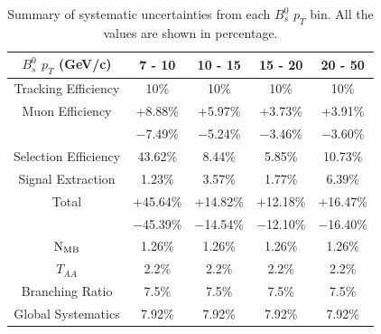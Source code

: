 \begin{table}[h]
\begin{center}
\caption{Summary of systematic uncertainties from each $B^0_s$ $p_T$ bin. All the values are shown in percentage.}
\vspace{1em}
\label{BsPtSystSum}
\begin{tabular}{ |c | c | c | c | c|}
\hline
$B^0_s$ $p_T$ (GeV/c) &  7 - 10 & 10 - 15 & 15 - 20 & 20 - 50  \\
\hline
Tracking Efficiency & 10\% & 10\% & 10\% & 10\% \\
Muon Efficiency     & +8.88\% & +5.97\% & +3.73\% & +3.91\% \\
                                & $-$7.49\% & $-$5.24\% & $-$3.46\% & $-$3.60\% \\
Selection Efficiency & 43.62\%  & 8.44\%  & 5.85\% & 10.73\%  \\
Signal Extraction & 1.23\%  & 3.57\% & 1.77\%  & 6.39\% \\
Total  & +45.64\% &  +14.82\% &  +12.18\% & +16.47\%  \\
      	 & $-$45.39\% &  $-$14.54\% &  $-$12.10\% &  $-$16.40\%  \\
\hline
 \hline
$\rm{N_{MB}} $ & 1.26\% & 1.26\% & 1.26\% & 1.26\% \\
$T_{AA}$ & 2.2\% & 2.2\% & 2.2\% & 2.2\% \\
Branching Ratio & 7.5\% & 7.5\% & 7.5\%& 7.5\%\\
Global Systematics & 7.92\% & 7.92\% & 7.92\%& 7.92\%\\
 \hline
\end{tabular}
\end{center}
\end{table}


